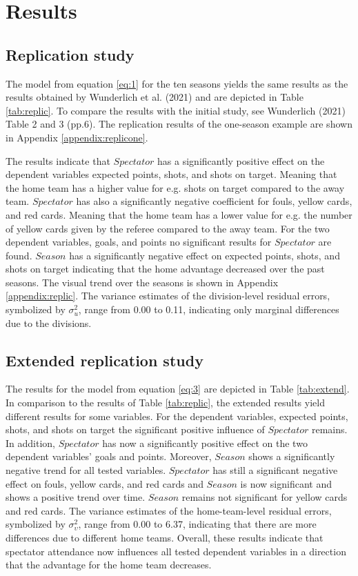 \section{Results}

\subsection{Replication study}
The model from equation \ref{eq:1} for the ten seasons yields the same results as the results obtained by Wunderlich et al. (2021) \cite{wunderlich2021does} and are depicted in Table \ref{tab:replic}. To compare the results with the initial study, see Wunderlich (2021) \cite{wunderlich2021does} Table 2 and 3 (pp.6). The replication results of the one-season example are shown in Appendix \ref{appendix:replicone}.

The results indicate that $Spectator$ has a significantly positive effect on the dependent variables expected points, shots, and shots on target. Meaning that the home team has a higher value for e.g. shots on target compared to the away team. $Spectator$ has also a significantly negative coefficient for fouls, yellow cards, and red cards. Meaning that the home team has a lower value for e.g. the number of yellow cards given by the referee compared to the away team. For the two dependent variables, goals, and points no significant results for $Spectator$ are found.
$Season$ has a significantly negative effect on expected points, shots, and shots on target indicating that the home advantage decreased over the past seasons. The visual trend over the seasons is shown in Appendix \ref{appendix:replic}. The variance estimates of the division-level residual errors, symbolized by $\sigma^2_{u}$, range from 0.00 to 0.11, indicating only marginal differences due to the divisions.

\subsection{Extended replication study}
The results for the model from equation \ref{eq:3} are depicted in Table \ref{tab:extend}. In comparison to the results of Table \ref{tab:replic}, the extended results yield different results for some variables. For the dependent variables, expected points, shots, and shots on target the significant positive influence of $Spectator$ remains. In addition, $Spectator$ has now a significantly positive effect on the two dependent variables' goals and points. Moreover, $Season$ shows a significantly negative trend for all tested variables.
$Spectator$ has still a significant negative effect on fouls, yellow cards, and red cards and $Season$ is now significant and shows a positive trend over time. $Season$ remains not significant for yellow cards and red cards. The variance estimates of the home-team-level residual errors, symbolized by $\sigma^2_{\upsilon}$, range from 0.00 to 6.37, indicating that there are more differences due to different home teams. Overall, these results indicate that spectator attendance now influences all tested dependent variables in a direction that the advantage for the home team decreases. 

